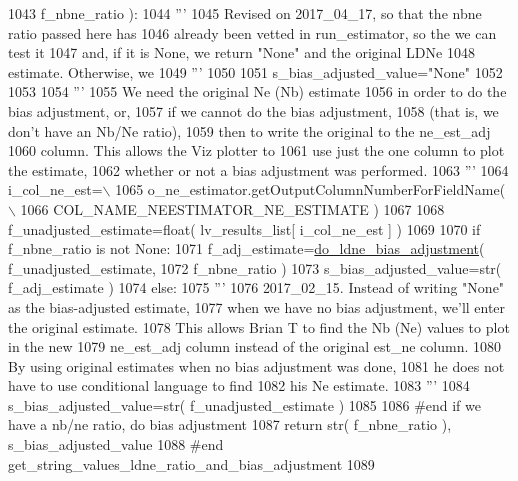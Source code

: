 \begin{DoxyCode}
1043                                                             f\_nbne\_ratio ):
1044     \textcolor{stringliteral}{'''}
1045 \textcolor{stringliteral}{    Revised on 2017\_04\_17, so that the nbne ratio passed here has }
1046 \textcolor{stringliteral}{    already been vetted in run\_estimator, so the we can test it}
1047 \textcolor{stringliteral}{    and, if it is None, we return "None" and the original LDNe}
1048 \textcolor{stringliteral}{    estimate.  Otherwise, we }
1049 \textcolor{stringliteral}{    '''}
1050 
1051     s\_bias\_adjusted\_value=\textcolor{stringliteral}{"None"}
1052 
1053 
1054     \textcolor{stringliteral}{'''}
1055 \textcolor{stringliteral}{    We need the original Ne (Nb)  estimate}
1056 \textcolor{stringliteral}{    in order to do the bias adjustment, or,}
1057 \textcolor{stringliteral}{    if we cannot do the bias adjustment, }
1058 \textcolor{stringliteral}{    (that is, we don't have an Nb/Ne ratio),}
1059 \textcolor{stringliteral}{    then to write the original to the ne\_est\_adj}
1060 \textcolor{stringliteral}{    column.  This allows the Viz plotter to}
1061 \textcolor{stringliteral}{    use just the one column to plot the estimate,}
1062 \textcolor{stringliteral}{    whether or not a bias adjustment was performed.}
1063 \textcolor{stringliteral}{    '''}
1064     i\_col\_ne\_est=\(\backslash\)
1065                 o\_ne\_estimator.getOutputColumnNumberForFieldName( \(\backslash\)
1066                                             COL\_NAME\_NEESTIMATOR\_NE\_ESTIMATE )
1067 
1068     f\_unadjusted\_estimate=float( lv\_results\_list[ i\_col\_ne\_est ] )
1069 
1070     \textcolor{keywordflow}{if} f\_nbne\_ratio \textcolor{keywordflow}{is} \textcolor{keywordflow}{not} \textcolor{keywordtype}{None}:
1071         f\_adj\_estimate=\hyperlink{namespacenegui_1_1pgdriveneestimator_a99dfc5e3dc217054199cd4f693e26236}{do\_ldne\_bias\_adjustment}( f\_unadjusted\_estimate,
1072                                                             f\_nbne\_ratio )
1073         s\_bias\_adjusted\_value=str( f\_adj\_estimate ) 
1074     \textcolor{keywordflow}{else}:
1075         \textcolor{stringliteral}{'''}
1076 \textcolor{stringliteral}{        2017\_02\_15.  Instead of writing "None" as the bias-adjusted estimate, }
1077 \textcolor{stringliteral}{        when we have no bias adjustment, we'll enter the original estimate.  }
1078 \textcolor{stringliteral}{        This allows Brian T to find the Nb (Ne) values to plot in the new }
1079 \textcolor{stringliteral}{        ne\_est\_adj column instead of the original est\_ne column.  }
1080 \textcolor{stringliteral}{        By using original estimates when no bias adjustment was done,}
1081 \textcolor{stringliteral}{        he does not have to use conditional language to find }
1082 \textcolor{stringliteral}{        his Ne estimate.}
1083 \textcolor{stringliteral}{        '''}
1084         s\_bias\_adjusted\_value=str( f\_unadjusted\_estimate )
1085 
1086     \textcolor{comment}{#end if we have a nb/ne ratio, do bias adjustment }
1087     \textcolor{keywordflow}{return} str( f\_nbne\_ratio ), s\_bias\_adjusted\_value
1088 \textcolor{comment}{#end get\_string\_values\_ldne\_ratio\_and\_bias\_adjustment}
1089 
\end{DoxyCode}
